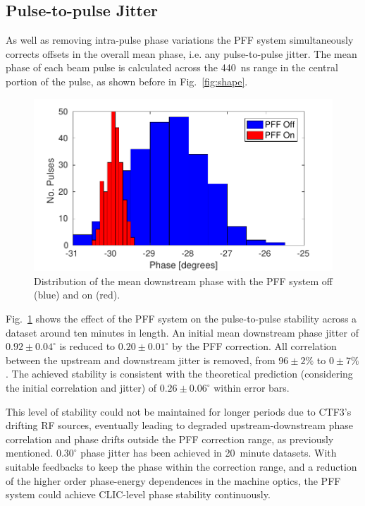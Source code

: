 \documentclass[%
 reprint,
superscriptaddress,
 amsmath,amssymb,
 prl,
]{revtex4-1}
\begin{document}

\subsection{\label{ss:meanJit}Pulse-to-pulse Jitter}

As well as removing intra-pulse phase variations the PFF system simultaneously 
corrects offsets in the overall mean phase, i.e. any pulse-to-pulse jitter. The 
mean phase of each beam pulse is calculated across the 440~ns range in the 
central portion of the pulse, as shown before in Fig.~\ref{fig:shape}.

\begin{figure}
	\includegraphics[width=\columnwidth]{figs/meanJit}%
	\caption{\label{fig:meanJit}Distribution of the mean downstream phase with 
		the 
		PFF system off (blue) and on (red).}
\end{figure}

Fig.~\ref{fig:meanJit} shows the effect of the PFF system on the pulse-to-pulse 
stability across a dataset around ten minutes in length. An 
initial mean downstream phase jitter of \(0.92\pm0.04^\circ\) is reduced to \(0.20\pm0.01^\circ\) by the PFF 
correction. All correlation between the upstream and downstream jitter is removed, from 
\(96\pm2\%\) to \(0\pm7\%\). The achieved stability is consistent with the theoretical prediction (considering the initial correlation and jitter) of \(0.26\pm0.06^\circ\) within error bars.

This level of stability could not be maintained for longer periods due to 
CTF3's drifting RF sources, eventually leading to degraded 
upstream-downstream phase correlation and phase drifts outside the PFF 
correction range, as previously mentioned. \(0.30^\circ\) phase jitter has been 
achieved in 20~minute datasets. With suitable feedbacks to keep the phase 
within the correction range, and a reduction of the higher order phase-energy 
dependences in the machine optics, the PFF system could achieve CLIC-level 
phase stability continuously.
\end{document}
